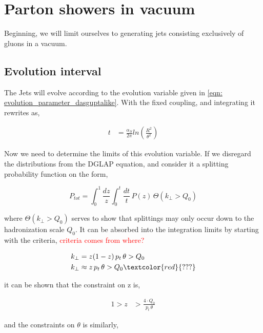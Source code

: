 \documentclass[main.tex]{subfiles}
\begin{document}
\section{Parton showers in vacuum}
Beginning, we will limit ourselves to generating jets consisting exclusively of gluons in a vacuum.

\subsection{Evolution interval }\label{sec: determining_evolution_time_from_sudakov}
The Jets will evolve according to the evolution variable given in \autoref{eqn: evolution_parameter_dasguptalike}. With the fixed coupling, and integrating it rewrites as, 

\begin{align}\label{eqn: evolution_parameter_integrated}
    t &= \frac{\alpha_S}{2\pi} ln(\frac{R^2}{\theta^2})
\end{align}

Now we need to determine the limits of this evolution variable. If we disregard the distributions from the DGLAP equation, and consider it a splitting probability function on the form,

\begin{equation}\label{eqn: dglap_ellis_style_probability_thetafunc}
    P_{tot} = \int_0^1 \frac{dz}{z} \int_0^{t} \frac{dt}{t} \, P(z) \, \Theta(k_\perp >Q_0)
\end{equation}

where \(\Theta(k_\perp >Q_0)\) serves to show that splittings may only occur down to the hadronization scale \(Q_0\). It can be absorbed into the integration limits by starting with the criteria, \textcolor{red}{ criteria comes from where? }

\begin{align}
    \begin{split}
        k_\perp &= z(1-z)\, p_t\, \theta > Q_0  \\
        k_\perp &\approx z\, p_t\, \theta > Q_0 \textcolor{red}{???}
    \end{split}
\end{align}

it can be shown that the constraint on z is,

\begin{align}
    1 > z &> \frac{4\cdot Q_0}{p_t\, \theta}
\end{align}

and the constraints on \(\theta\) is similarly,
\end{document}
